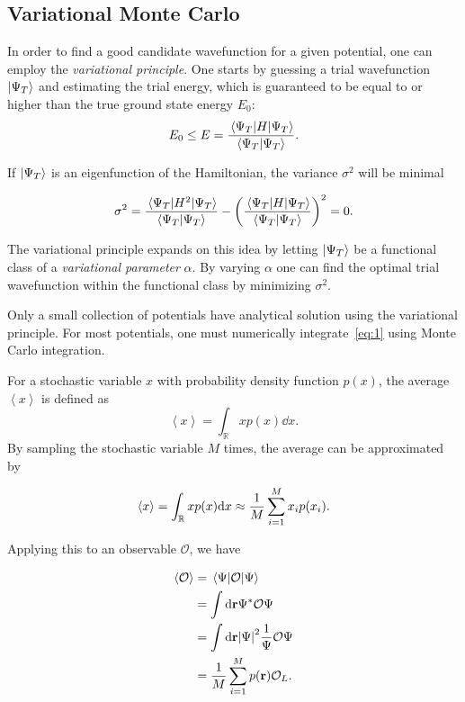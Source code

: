\subsection{Variational Monte Carlo}
In order to find a good candidate wavefunction for a given potential, one can
employ the \textit{variational principle}. One starts by guessing a trial
wavefunction \(\ket{\Psi_{T}}\) and estimating the trial energy, which is
guaranteed to be equal to or higher than the true ground state energy \(E_{0}\):
\begin{equation}
  \label{eq:1}
  E_{0} \le E = \frac{\ev{H}{\Psi_{T}}}{\ip{\Psi_{T}}}.
\end{equation}

If \(\ket{\Psi_{T}}\) is an eigenfunction of the Hamiltonian, the variance
\(\sigma^{2}\) will be minimal

\begin{equation*}
  \sigma^{2} = \frac{\ev{H^{2}}{\Psi_{T}}}{\ip{\Psi_{T}}} -\left( \frac{\ev{H}{\Psi_{T}}}{\ip{\Psi_{T}}} \right)^{2} = 0.
\end{equation*}

The variational principle expands on this idea by letting \(\ket{\Psi_{T}}\) be
a functional class of a \textit{variational parameter} \(\alpha\). By varying
\(\alpha\) one can find the optimal trial wavefunction within the functional
class by minimizing \(\sigma^{2}\). 

Only a small collection of potentials have analytical solution using the
variational principle. For most potentials, one must numerically
integrate~\eqref{eq:1} using Monte Carlo integration.

For a stochastic variable \(x\) with probability density function \(p(x)\), the
average \(\left< x \right>\) is defined as
\begin{equation*}
  \left< x \right> = \int_{\mathbb{R}} xp(x)\dd x.
\end{equation*}
By sampling the stochastic variable \(M\) times, the average can be approximated
by 

\begin{equation*}
  \expval{x} = \int_{\mathbb{R}} xp(x)\dd x \approx \frac{1}{M}\sum_{i=1}^{M}x_{i}p(x_{i}).
\end{equation*}

Applying this to an observable \(\mathcal{O}\), we have

\begin{align*}
  \expval{\mathcal{O}} &= \ev{\mathcal{O}}{\Psi}\\
                       &= \int \dd \vb{r} \Psi^{*}\mathcal{O}\Psi \\
                       &= \int \dd \vb{r} \abs{\Psi}^{2} \frac{1}{\Psi}\mathcal{O}\Psi\\
  &= \frac{1}{M} \sum_{i=1}^{M}p(\vb{r})\mathcal{O}_{L}.
\end{align*}

